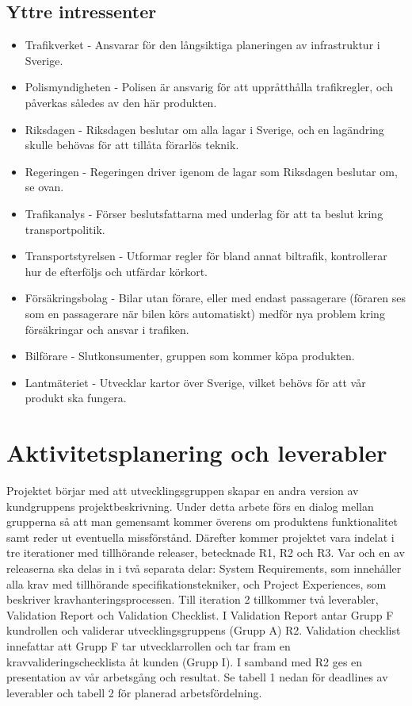 \documentclass[10pt]{article}
\begin{document}
\subsection{Yttre intressenter}
\noindent
\begin{itemize}
	\setlength\itemsep{0.1em}
	\item Trafikverket - Ansvarar för den långsiktiga planeringen av infrastruktur i Sverige.
	\item Polismyndigheten - Polisen är ansvarig för att uppråtthålla trafikregler, och påverkas således av den här produkten.
	\item Riksdagen - Riksdagen beslutar om alla lagar i Sverige, och en lagändring skulle behövas för att tillåta förarlös teknik.
	\item Regeringen - Regeringen driver igenom de lagar som Riksdagen beslutar om, se ovan.
	\item Trafikanalys - Förser beslutsfattarna med underlag för att ta beslut kring transportpolitik.
	\item Transportstyrelsen - Utformar regler för bland annat biltrafik, kontrollerar hur de efterföljs och utfärdar körkort.
	\item Försäkringsbolag - Bilar utan förare, eller med endast passagerare (föraren ses som en passagerare när bilen körs automatiskt) medför nya problem kring försäkringar och ansvar i trafiken.
	\item Bilförare - Slutkonsumenter, gruppen som kommer köpa produkten.
	\item Lantmäteriet - Utvecklar kartor över Sverige, vilket behövs för att vår produkt ska fungera.
\end{itemize}

\section{Aktivitetsplanering och leverabler}
\sloppy
\noindent
Projektet börjar med att utvecklingsgruppen skapar en andra version av kundgruppens projektbeskrivning. Under detta arbete förs en dialog mellan grupperna så att man gemensamt kommer överens om produktens funktionalitet samt reder ut eventuella missförstånd.  
Därefter kommer projektet vara indelat i tre iterationer med tillhörande releaser, betecknade R1, R2 och R3. Var och en av releaserna ska delas in i två separata delar: System Requirements, som innehåller alla krav med tillhörande specifikationstekniker, och Project Experiences, som beskriver kravhanteringsprocessen. Till iteration 2 tillkommer två leverabler, Validation Report och Validation Checklist. I Validation Report antar Grupp F kundrollen och validerar utvecklingsgruppens (Grupp A) R2. Validation checklist innefattar att Grupp F tar utvecklarrollen och tar fram en kravvalideringschecklista åt kunden (Grupp I). I samband med R2 ges en presentation av vår arbetsgång och resultat. Se tabell 1 nedan för deadlines av leverabler och tabell 2 för planerad arbetsfördelning.  
\\
\\
\end{document}
